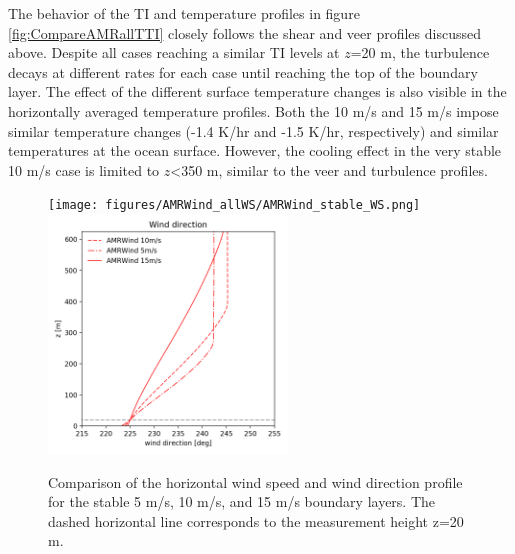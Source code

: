 The behavior of the TI and temperature profiles in figure
\ref{fig:CompareAMRallTTI} closely follows the shear and veer profiles
discussed above.  Despite all cases reaching a similar TI levels at
$z$=20 m, the turbulence decays at different rates for each case until
reaching the top of the boundary layer.  The effect of the different
surface temperature changes is also visible in the horizontally
averaged temperature profiles.  Both the 10 m/s and 15 m/s impose
similar temperature changes (-1.4 K/hr and -1.5 K/hr, respectively)
and similar temperatures at the ocean surface.  However, the
cooling effect in the very stable 10 m/s case is limited to $z$<350
m, similar to the veer and turbulence profiles.

\begin{figure}[hbt!]
  \centering
  \texttt{[image: figures/AMRWind\_allWS/AMRWind\_stable\_WS.png]}
  \includegraphics[width=2.5in]{figures/AMRWind_allWS/AMRWind_stable_WDir.png}
  \caption{ \label{fig:CompareAMRallWS} Comparison of the horizontal
    wind speed and wind direction profile for the stable 5 m/s, 10
    m/s, and 15 m/s boundary layers. The dashed horizontal line
    corresponds to the measurement height z=20 m.}
\end{figure}

